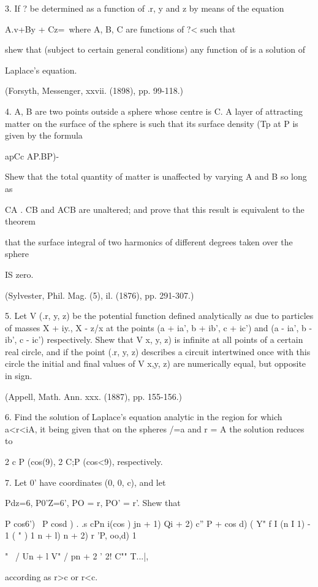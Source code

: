 3. If ? be determined as a function of .r, y and z by means of the
equation

A.v+By + Cz=\, where A, B, C are functions of ?< such that

shew that (subject to certain general conditions) any function of is a
solution of

Laplace's equation.

(Forsyth, Messenger, xxvii. (1898), pp. 99-118.)

4. A, B are two points outside a sphere whose centre is C. A layer of
attracting matter on the surface of the sphere is such that its
surface density (Tp at P is given by the formula

apCc AP.BP)-\

Shew that the total quantity of matter is unaffected by varying A and
B so long as

CA . CB and ACB are unaltered; and prove that this result is
equivalent to the theorem

that the surface integral of two harmonics of different degrees taken
over the sphere

IS zero.

(Sylvester, Phil. Mag. (5), il. (1876), pp. 291-307.)

5. Let V (.r, y, z) be the potential function defined analytically as
due to particles of masses X + iy., X - z/x at the points (a + ia', b
+ ib', c + ic') and (a - ia', b - ib', c - ic') respectively. Shew
that V x, y, z) is infinite at all points of a certain real circle,
and if the point (.r, y, z) describes a circuit intertwined once with
this circle the initial and final values of V x,y, z) are numerically
equal, but opposite in sign.

(Appell, Math. Ann. xxx. (1887), pp. 155-156.)

6. Find the solution of Laplace's equation analytic in the region for
which a<r<iA, it being given that on the spheres /=a and r = A the
solution reduces to

2 c P (cos(9), 2 C;P (cos<9), respectively.

7. Let 0' have coordinates (0, 0, c), and let

Pdz=6, P0'Z=6', PO = r, PO' = r'. Shew that

P cos6') \ P cosd ) . .s cPn i(cos ) jn + 1) Qi + 2) c'' P + cos d) (
Y" f I (n I 1) - 1 ( " ) 1 n + l) n + 2) r 'P, oo,d) 1

"~ / Un + l V" / pn + 2 ' 2! C"" T...|,

according as r>c or r<c.

